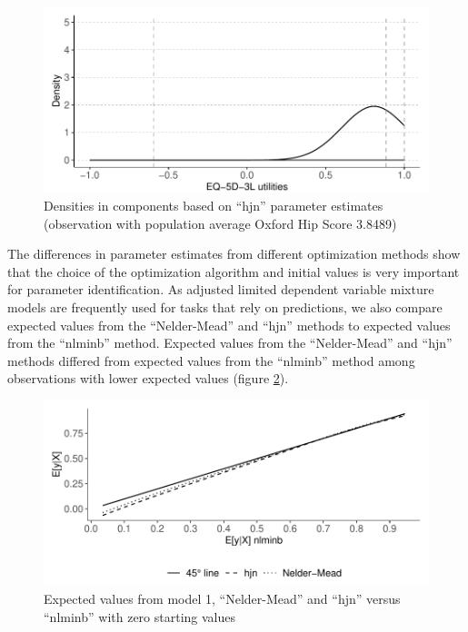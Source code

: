 \documentclass[
]{article}
\begin{document}
\begin{figure}
\centering
\includegraphics{aldvmm_vignette_files/figure-latex/fig-comp-dens3-1.pdf}
\caption{\label{fig:fig-comp-dens3}Densities in components based on ``hjn'' parameter estimates (observation with population average Oxford Hip Score 3.8489)}
\end{figure}

The differences in parameter estimates from different optimization methods show that the choice of the optimization algorithm and initial values is very important for parameter identification. As adjusted limited dependent variable mixture models are frequently used for tasks that rely on predictions, we also compare expected values from the ``Nelder-Mead'' and ``hjn'' methods to expected values from the ``nlminb'' method. Expected values from the ``Nelder-Mead'' and ``hjn'' methods differed from expected values from the ``nlminb'' method among observations with lower expected values (figure \ref{fig:plot-comp-pred}).

\begin{figure}
\centering
\includegraphics{aldvmm_vignette_files/figure-latex/plot-comp-pred-1.pdf}
\caption{\label{fig:plot-comp-pred}Expected values from model 1, ``Nelder-Mead'' and ``hjn'' versus ``nlminb'' with zero starting values}
\end{figure}
\end{document}
